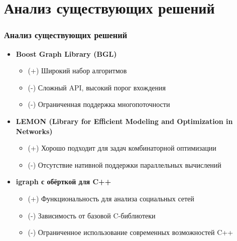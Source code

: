 \documentclass[aspectratio=169]{beamer}
\begin{document}
\section{Анализ существующих решений}
\begin{frame}
  \frametitle{Анализ существующих решений}
  \begin{itemize}
    \item \textbf{Boost Graph Library (BGL)}
      \begin{itemize}
        \item (+) Широкий набор алгоритмов
        \item (-) Сложный API, высокий порог вхождения
        \item (-) Ограниченная поддержка многопоточности
      \end{itemize}
    \item \textbf{LEMON (Library for Efficient Modeling and Optimization in Networks)}
      \begin{itemize}
        \item (+) Хорошо подходит для задач комбинаторной оптимизации
        \item (-) Отсутствие нативной поддержки параллельных вычислений
      \end{itemize}
    \item \textbf{igraph с обёрткой для C++}
      \begin{itemize}
        \item (+) Функциональность для анализа социальных сетей
        \item (-) Зависимость от базовой C-библиотеки
        \item (-) Ограниченное использование современных возможностей C++
      \end{itemize}
  \end{itemize}
\end{frame}

\end{document}
